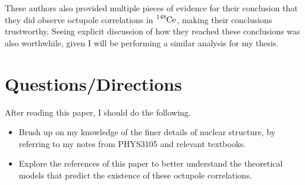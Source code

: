 \documentclass[12pt,a4paper]{article}
\begin{document}
\medskip
These authors also provided multiple pieces of evidence for their conclusion that they did observe octupole correlations in $\ce{^{148}Ce}$, making their conclusions trustworthy. Seeing explicit discussion of how they reached these conclusions was also worthwhile, given I will be performing a similar analysis for my thesis.

\section*{Questions/Directions}
After reading this paper, I should do the following.
\begin{itemize}
\item Brush up on my knowledge of the finer details of nuclear structure, by referring to my notes from PHYS3105 and relevant textbooks.
\item Explore the references of this paper to better understand the theoretical models that predict the existence of these octupole correlations.
\end{itemize}

%

\end{document}

